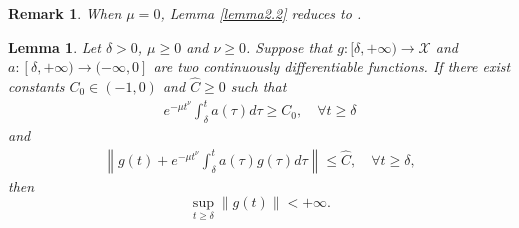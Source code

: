 \documentclass[review]{elsarticle}
\newtheorem{lemma}{Lemma}[section]
\newtheorem{remark}{Remark}[section]
\begin{document}
\begin{remark}  
When  $\mu=0$,  Lemma  \ref{lemma2.2} reduces to   \cite[Lemma 6]{HeHFiietal(2022)}.
\end{remark}	


	\begin{lemma}\label{lemma2.3}
		 Let $\delta>0$,  $\mu\geq0$ and $\nu\geq0$. Suppose that  $g:[\delta,+\infty)\rightarrow  \mathcal{X}$ and  $a : [\delta,+\infty)\rightarrow (-\infty, 0]$  are two continuously differentiable functions. If  there exist constants  $C_0\in (-1, 0)$ and  $\widehat{C}\geq0$ such that
		\begin{eqnarray}\label{zfe4}
			e^{-\mu t^{\nu}}\int_{\delta}^{t}a(\tau)d\tau\geq C_0, \quad \forall t\geq \delta
		\end{eqnarray}
		and
		\begin{eqnarray}\label{zfe3}
			\left\|g(t)+e^{-\mu t^{\nu}}\int_{\delta}^{t}a(\tau)g(\tau)d\tau\right\|\leq \widehat{C}, \quad \forall t\geq \delta,
		\end{eqnarray}
		then
		$$\sup_{t\geq \delta}\|g(t)\|<+\infty.$$
	\end{lemma}
	
\end{document}
